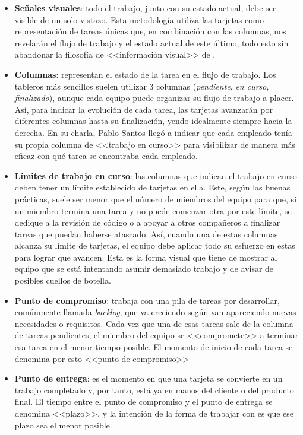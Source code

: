 \documentclass{subfiles}
\begin{document}
        \begin{itemize}
            \item {\textbf{Señales visuales}: todo el trabajo, junto con su estado actual, debe ser visible de un solo vistazo. Esta metodología utiliza las tarjetas como representación de tareas únicas que, en combinación con las columnas, nos revelarán el flujo de trabajo y el estado actual de este último, todo esto sin abandonar la filosofía de <<información visual>> de \Kanban.}
            \item {\textbf{Columnas}: representan el estado de la tarea en el flujo de trabajo. Los tableros más sencillos suelen utilizar 3 columnas (\textit{pendiente}, \textit{en curso}, \textit{finalizado}), aunque cada equipo puede organizar su flujo de trabajo a placer. Así, para indicar la evolución de cada tarea, las tarjetas avanzarán por diferentes columnas hasta su finalización, yendo idealmente siempre hacia la derecha. En su charla, Pablo Santos llegó a indicar que cada empleado tenía su propia columna de <<trabajo en curso>> para visibilizar de manera más eficaz con qué tarea se encontraba cada empleado.}
            \item {\textbf{Límites de trabajo en curso}: las columnas que indican el trabajo en curso deben tener un límite establecido de tarjetas en ella. Este, según las buenas prácticas, suele ser menor que el número de miembros del equipo para que, si un miembro termina una tarea y no puede comenzar otra por este límite, se dedique a la revisión de código o a apoyar a otros compañeros a finalizar tareas que puedan haberse atascado. Así, cuando una de estas columnas alcanza su límite de tarjetas, el equipo debe aplicar todo su esfuerzo en estas para lograr que avancen. Esta es la forma visual que tiene \Kanban de mostrar al equipo que se está intentando asumir demasiado trabajo y de avisar de posibles cuellos de botella.}
            \item {\textbf{Punto de compromiso}: \Kanban trabaja con una pila de tareas por desarrollar, comúnmente llamada \textit{backlog}, que va creciendo según van apareciendo nuevas necesidades o requisitos. Cada vez que una de esas tareas sale de la columna de tareas pendientes, el miembro del equipo se <<compromete>> a terminar esa tarea en el menor tiempo posible. El momento de inicio de cada tarea se denomina por esto <<punto de compromiso>>}
            \item {\textbf{Punto de entrega}: es el momento en que una tarjeta se convierte en un trabajo completado y, por tanto, está ya en manos del cliente o del producto final. El tiempo entre el punto de compromiso y el punto de entrega se denomina <<plazo>>, y la intención de la forma de trabajar con \Kanban es que ese plazo sea el menor posible.}
        \end{itemize}
        
\end{document}
